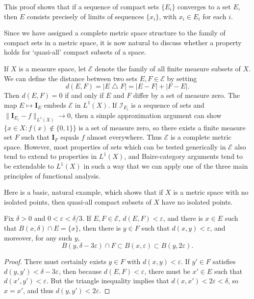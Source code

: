\begin{remark}
	This proof shows that if a sequence of compact sets $\{ E_i \}$ converges to a set $E$, then $E$ consists precisely of limits of sequences $\{ x_i \}$, with $x_i \in E_i$ for each $i$.
\end{remark}

Since we have assigned a complete metric space structure to the family of compact sets in a metric space, it is now natural to discuss whether a property holds for `quasi-all' compact subsets of a space.

\begin{remark}
	If $X$ is a measure space, let $\mathcal{E}$ denote the family of all finite measure subsets of $X$. We can define the distance between two sets $E,F \in \mathcal{E}$ by setting
	\[ d(E,F) = |E \bigtriangleup F| = |E - F| + |F - E|. \]
	Then $d(E,F) = 0$ if and only if $E$ and $F$ differ by a set of measure zero. The map $E \mapsto \mathbf{I}_E$ embeds $\mathcal{E}$ in $L^1(X)$. If $\mathcal{I}_{E_i}$ is a sequence of sets and $\| \mathbf{I}_{E_i} - f \|_{L^1(X)} \to 0$, then a simple approximation argument can show $\{ x \in X: f(x) \not \in \{ 0, 1 \} \}$ is a set of measure zero, so there exists a finite measure set $F$ such that $\mathbf{I}_F$ equals $f$ almost everywhere. Thus $\mathcal{E}$ is a complete metric space. However, most properties of sets which can be tested generically in $\mathcal{E}$ also tend to extend to properties in $L^1(X)$, and Baire-category arguments tend to be extendable to $L^1(X)$ in such a way that we can apply one of the three main principles of functional analysis.
\end{remark}

Here is a basic, natural example, which shows that if $X$ is a metric space with no isolated points, then quasi-all compact subsets of $X$ have no isolated points.

\begin{lemma}
	Fix $\delta > 0$ and $0 < \varepsilon < \delta/3$. If $E,F \in \mathcal{E}$, $d(E,F) < \varepsilon$, and there is $x \in E$ such that $B(x,\delta) \cap E = \{ x \}$, then there is $y \in F$ such that $d(x,y) < \varepsilon$, and moreover, for any such $y$,
	\[ B(y,\delta - 3\varepsilon) \cap F \subset B(x,\varepsilon) \subset B(y,2\varepsilon). \]
\end{lemma}
\begin{proof}
	There must certainly exists $y \in F$ with $d(x,y) < \varepsilon$. If $y' \in F$ satisfies $d(y,y') < \delta - 3\varepsilon$, then because $d(E,F) < \varepsilon$, there must be $x' \in E$ such that $d(x',y') < \varepsilon$. But the triangle inequality implies that $d(x,x') < 2\varepsilon < \delta$, so $x = x'$, and thus $d(y,y') < 2\varepsilon$.
\end{proof}

